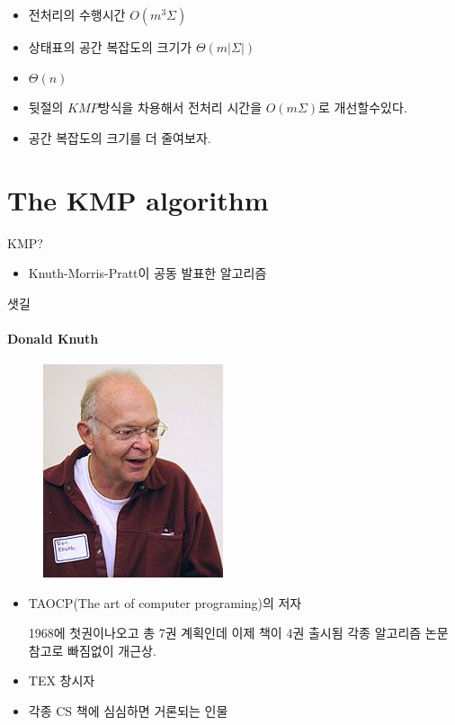 \documentclass[10pt]{beamer}
\begin{document}
\begin{frame}
    \begin{itemize}
        \item 전처리의 수행시간 $O(m^3 \Sigma)$
        \item 상태표의 공간 복잡도의 크기가 $\Theta(m|\Sigma|)$
        \item $\Theta(n)$
    \end{itemize}
\end{frame}

\begin{frame}
    \begin{itemize}
        \item 뒷절의 $KMP$방식을 차용해서 전처리 시간을 $O(m \Sigma)$로 개선할수있다.
        \item 공간 복잡도의 크기를 더 줄여보자.    
    \end{itemize}
\end{frame}








\section{The KMP algorithm}

\begin{frame}{KMP?}
    \begin{itemize}
        \item Knuth-Morris-Pratt이 공동 발표한 알고리즘
    \end{itemize}
\end{frame}


\begin{frame}{샛길}
    \framesubtitle{Donald Knuth}
    \begin{figure}[h!]
        \centering
        \includegraphics[scale=0.7]{pic5}
    \end{figure}
    \begin{itemize}
        \item TAOCP(The art of computer programing)의 저자 
        
        1968에 첫권이나오고 총 7권 계획인데 이제 책이 4권 출시됨 
        각종 알고리즘 논문 참고로 빠짐없이 개근상.
        \item TEX 창시자
        \item 각종 CS 책에 심심하면 거론되는 인물
    \end{itemize}
\end{frame}
\end{document}
